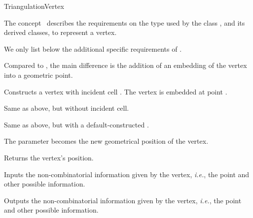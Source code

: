 \begin{ccRefConcept}{TriangulationVertex}

\ccDefinition

The concept \ccRefName\ describes the requirements on the type used by the
class , and its derived classes, to
represent a vertex.

\ccRefines


We only list below the additional specific requirements of \ccRefName.

Compared to , the main difference is the addition of
an embedding of the vertex into a geometric point.

\ccHasModels


\ccTypes


\ccCreation
{}

%
{Constructs a vertex with incident cell . The vertex is embedded at point .}

\ccGlue{}%
{Same as above, but without incident cell.}%

\ccGlue{}%
{Same as above, but with a default-constructed .}

\ccOperations

%
{The parameter  becomes the new geometrical position of the vertex.}

%
{Returns the vertex's position.}


%
{Inputs the non-combinatorial information given by the vertex, \emph{i.e.},
the point and other possible information.}

%
{Outputs the non-combinatorial information given by the vertex, \emph{i.e.},
the point and other possible information.}

\ccSeeAlso

\\
\\

\end{ccRefConcept}
